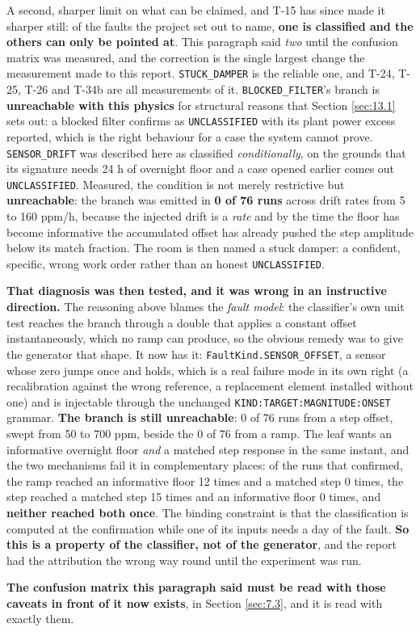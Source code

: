 A second, sharper limit on what can be claimed, and T-15 has since made it sharper still: of the
faults the project set out to name, \textbf{one is classified and the others can only be
pointed at}. This paragraph said \emph{two} until the confusion matrix was measured, and the
correction is the single largest change the measurement made to this report.
\texttt{STUCK\_DAMPER} is the reliable one, and T-24, T-25, T-26 and T-34b are all measurements of
it. \texttt{BLOCKED\_FILTER}'s branch is \textbf{unreachable with this physics} for structural
reasons that Section \ref{sec:13.1} sets out: a blocked filter confirms as \texttt{UNCLASSIFIED} with its
plant power excess reported, which is the right behaviour for a case the system cannot prove.
\texttt{SENSOR\_DRIFT} was described here as classified \emph{conditionally}, on the grounds that
its signature needs 24 h of overnight floor and a case opened earlier comes out
\texttt{UNCLASSIFIED}. Measured, the condition is not merely restrictive but \textbf{unreachable}: the branch was emitted
in \textbf{0 of 76 runs} across drift rates from 5 to 160 ppm/h, because the injected drift is a
\emph{rate} and by the time the floor has become informative the accumulated offset has already
pushed the step amplitude below its match fraction. The room is then named a stuck damper: a
confident, specific, wrong work order rather than an honest \texttt{UNCLASSIFIED}.

\textbf{That diagnosis was then tested, and it was wrong in an instructive direction.} The reasoning
above blames the \emph{fault model}: the classifier's own unit test reaches the branch through a
double that applies a constant offset instantaneously, which no ramp can produce, so the obvious
remedy was to give the generator that shape. It now has it: \texttt{FaultKind.SENSOR\_OFFSET}, a
sensor whose zero jumps once and holds, which is a real failure mode in its own right (a
recalibration against the wrong reference, a replacement element installed without one) and is
injectable through the unchanged \texttt{KIND:TARGET:MAGNITUDE:ONSET} grammar. \textbf{The branch is
still unreachable}: 0 of 76 runs from a step offset, swept from 50 to 700 ppm, beside the 0 of 76
from a ramp. The leaf wants an informative overnight floor \emph{and} a matched step response in the
same instant, and the two mechanisms fail it in complementary places: of the runs that confirmed,
the ramp reached an informative floor 12 times and a matched step 0 times, the step reached a matched
step 15 times and an informative floor 0 times, and \textbf{neither reached both once}. The binding
constraint is that the classification is computed at the confirmation while one of its inputs needs a
day of the fault. \textbf{So this is a property of the classifier, not of the generator}, and the
report had the attribution the wrong way round until the experiment was run.

\textbf{The confusion matrix this paragraph said must be read with those caveats in front
of it now exists}, in Section \ref{sec:7.3}, and it is read with exactly them.
